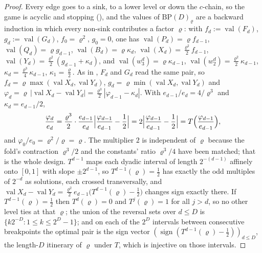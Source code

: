 \documentclass[11pt]{article}
\theoremstyle{plain}
\theoremstyle{definition}
\DeclareMathOperator{\val}{val}
\begin{document}
\begin{proof}
Every edge goes to a sink, to a lower level or down the $c$-chain, so the
game is acyclic and stopping (), and the values of
$\mathrm{BP}(D)_{\varrho}$ are a backward induction in which every non-sink
contributes a factor $\varrho$: with $f_d:=\val(F_d)$, $g_d:=\val(G_d)$,
$f_0=\varrho^{2}$, $g_0=0$, one has $\val(P_d)=\varrho f_{d-1}$,
$\val(Q_d)=\varrho g_{d-1}$, $\val(B_d)=\varrho\kappa_d$,
$\val(X_d)=\tfrac{\varrho^{2}}2f_{d-1}$,
$\val(Y_d)=\tfrac{\varrho^{2}}2(g_{d-1}+\kappa_d)$, and
$\val(w^{d}_3)=\varrho\kappa_{d-1}$,
$\val(w^{d}_2)=\tfrac{\varrho^{2}}2\kappa_{d-1}$,
$\kappa_d=\tfrac{\varrho^{3}}4\kappa_{d-1}$, $\kappa_1=\tfrac{\varrho}2$. As in
, $F_d$ and $G_d$ read the same pair, so
$f_d=\varrho\max(\val X_d,\val Y_d)$, $g_d=\varrho\min(\val X_d,\val Y_d)$
and $\varphi_d=\varrho\,|\val X_d-\val Y_d|=\tfrac{\varrho^{3}}2|\varphi_{d-1}-\kappa_d|$.
With $e_{d-1}/e_d=4/\varrho^{3}$ and $\kappa_d=e_{d-1}/2$,
\[
  \frac{\varphi_d}{e_d}=\frac{\varrho^{3}}2\cdot\frac{e_{d-1}}{e_d}
  \Bigl|\frac{\varphi_{d-1}}{e_{d-1}}-\frac12\Bigr|
  =2\Bigl|\frac{\varphi_{d-1}}{e_{d-1}}-\frac12\Bigr|
  =T\Bigl(\frac{\varphi_{d-1}}{e_{d-1}}\Bigr),
\]
and $\varphi_0/e_0=\varrho^{2}/\varrho=\varrho$. The multiplier $2$ is
independent of $\varrho$ because the fold's contraction $\varrho^{3}/2$ and
the constants' ratio $\varrho^{3}/4$ have been matched; that is the whole
design. $T^{d-1}$ maps each dyadic interval of length $2^{-(d-1)}$ affinely
onto $[0,1]$ with slope $\pm2^{d-1}$, so $T^{d-1}(\varrho)=\tfrac12$ has
exactly the odd multiples of $2^{-d}$ as solutions, each crossed
transversally, and
$\val X_d-\val Y_d=\tfrac{\varrho^{2}}2e_{d-1}\bigl(T^{d-1}(\varrho)-\tfrac12\bigr)$
changes sign exactly there. If $T^{d-1}(\varrho)=\tfrac12$ then
$T^{d}(\varrho)=0$ and $T^{j}(\varrho)=1$ for all $j>d$, so no other level
ties at that $\varrho$; the union of the reversal sets over $d\le D$ is
$\{k2^{-D}:1\le k\le2^{D}-1\}$; and on each of the $2^{D}$ intervals between
consecutive breakpoints the optimal pair is the sign vector
$(\operatorname{sign}(T^{d-1}(\varrho)-\tfrac12))_{d\le D}$, the length-$D$
itinerary of $\varrho$ under $T$, which is injective on those intervals.
\end{proof}
\end{document}
